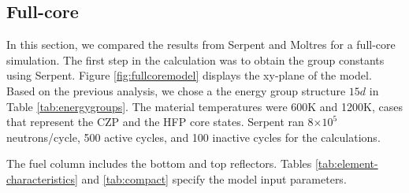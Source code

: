 \documentclass[11pt,letterpaper]{article}
\begin{document}
\subsection{Full-core}

In this section, we compared the results from Serpent and Moltres for a full-core simulation.
The first step in the calculation was to obtain the group constants using Serpent.
Figure \ref{fig:fullcoremodel} displays the xy-plane of the model.
Based on the previous analysis, we chose a the energy group structure $15d$ in Table \ref{tab:energygroups}.
The material temperatures were 600K and 1200K, cases that represent the \gls{CZP} and the \gls{HFP} core states.
Serpent ran 8$\times 10^5$ neutrons/cycle, 500 active cycles, and 100 inactive cycles for the calculations.







The fuel column includes the bottom and top reflectors.
Tables \ref{tab:element-characteristics} and \ref{tab:compact} specify the model input parameters.

\end{document}
